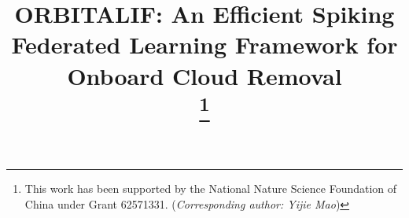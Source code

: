 \documentclass[conference]{IEEEtran}
\begin{document}
\title{ORBITALIF: An Efficient Spiking Federated Learning Framework for Onboard Cloud Removal\\
\thanks{This work has been supported by the National Nature Science Foundation of China under Grant 62571331. (\textit{Corresponding author: Yijie Mao})}
}

\author{
}

\maketitle
\end{document}
